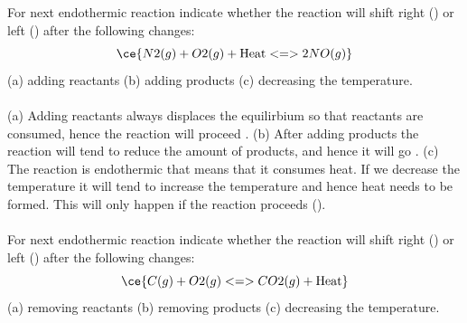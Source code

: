\documentclass[main.tex]{subfiles}
\begin{document}
\begin{example} %
For next endothermic reaction indicate whether the reaction will shift right (\ce{->}) or left (\ce{<-}) after the following changes:
 \begin{equation*} \ce{N2(g) + O2(g) +  \text{Heat} <=> 2NO(g) } \end{equation*}
 (a) adding reactants (b) adding products (c) decreasing the temperature. 
\\
\\
(a) Adding reactants always displaces the equilirbium so that reactants are consumed, hence the reaction will proceed \ce{->}. (b) After adding products the reaction will tend to reduce the amount of products, and hence it will go \ce{<-}. (c) The reaction is endothermic that means that it consumes heat. If we decrease the temperature it will tend to increase the temperature and hence heat needs to be formed. This will only happen if the reaction proceeds (\ce{<-}).
\\
\faDiamond\ \\
For next endothermic reaction indicate whether the reaction will shift right (\ce{->}) or left (\ce{<-}) after the following changes:
 \begin{equation*} \ce{C(g) + O2(g)  <=> CO2(g) +  \text{Heat} } \end{equation*}
 (a) removing reactants (b) removing products (c) decreasing the temperature. 
 \\
\end{example}%
\end{document}
